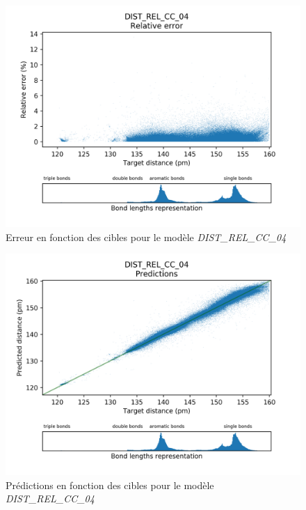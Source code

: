 \begin{figure}[!h]
	\centering
	
	\includegraphics[scale=0.8]{../figures/DIST_REL_CC_04/DIST_REL_CC_04_distrib_rmse_dist.png}	
	
	\caption{Erreur en fonction des cibles pour le modèle \emph{DIST\_REL\_CC\_04}}
\end{figure}

\begin{figure}[!h]
	\centering
	
	\includegraphics[scale=0.8]{../figures/DIST_REL_CC_04/DIST_REL_CC_04_preds_targets.png}	
	
	\caption{Prédictions en fonction des cibles pour le modèle \emph{DIST\_REL\_CC\_04}}
	
\end{figure}

